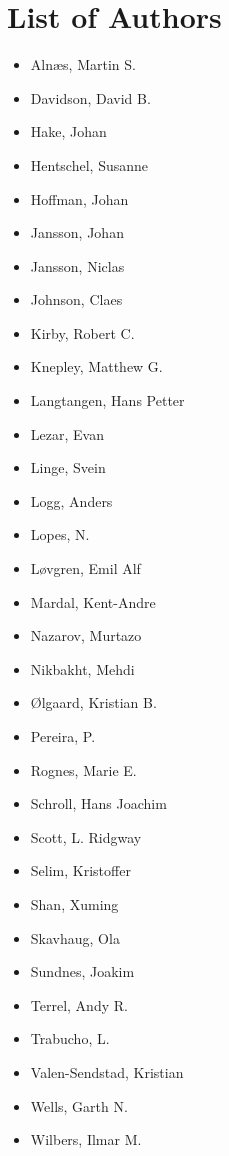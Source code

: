 \chapter*{List of Authors}


\begin{itemize}
\item
  Aln{\ae}s, Martin S.
\item
  Davidson, David B.
\item
  Hake, Johan 
\item
  Hentschel, Susanne 
\item
  Hoffman, Johan 
\item
  Jansson, Johan 
\item
  Jansson, Niclas 
\item
  Johnson, Claes 
\item
  Kirby, Robert C.
\item
  Knepley, Matthew G.
\item
  Langtangen, Hans Petter
\item
  Lezar, Evan 
\item
  Linge, Svein 
\item
  Logg, Anders 
\item
  Lopes, N. 
\item
  L{\o}vgren, Emil Alf
\item
  Mardal, Kent-Andre 
\item
  Nazarov, Murtazo 
\item
  Nikbakht, Mehdi
\item
  \O{}lgaard, Kristian B.
\item
  Pereira, P. 
\item
  Rognes, Marie E.
\item
  Schroll, Hans Joachim
\item
  Scott, L. Ridgway
\item
  Selim, Kristoffer 
\item
  Shan, Xuming 
\item
  Skavhaug, Ola 
\item
  Sundnes, Joakim 
\item
  Terrel, Andy R.
\item
  Trabucho, L. 
\item
  Valen-Sendstad, Kristian 
\item
  Wells, Garth N.
\item
  Wilbers, Ilmar M.
\end{itemize}
